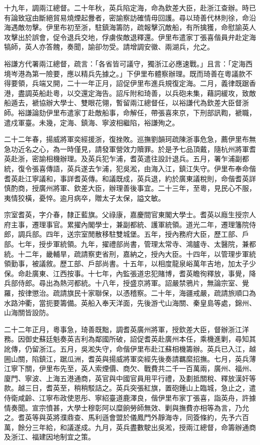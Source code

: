 \begin{pinyinscope}
十九年，調兩江總督。二十年秋，英兵陷定海，命為欽差大臣，赴浙江查辦。時已有論致寇由斷絕貿易燒煙起釁者，密諭察訪確情毋回護。尋以琦善代林則徐，命沿海遇敵勿擊。伊里布初至浙，駐鎮海籌防，疏報擊沉敵船，有所擒獲，命慰諭英人攻擊出於誤會，促令退兵交地，俘虜俟敵退釋還。伊里布遣家丁張喜偕員弁赴定海犒師，英人亦答餽，奏聞，諭卻勿受。請增調安徽、兩湖兵，允之。

裕謙方代署兩江總督，疏言：「各省皆可議守，獨浙江必應速戰。」且言：「定海西境岑港為第一險要，應以精兵先據之。」下伊里布體察辦理。既而琦善在粵議款不得要領，兵端又開，二十一年正月，詔促伊里布進兵規復定海。二月，義律既踞香港，盡調英船赴粵，以交還定海告。詔斥附和琦善，以兵砲未集，藉詞緩攻，致敵船遁去，褫協辦大學士、雙眼花翎，暫留兩江總督任，以裕謙代為欽差大臣督浙師。裕謙論劾伊里布遣家丁赴敵船事，命解任，帶張喜來京，下刑部訊鞫，褫職，遣戍軍臺。未幾，定海、鎮海、寧波相繼陷，裕謙殉之。

二十二年春，揚威將軍奕經援浙，復挫敗。巡撫劉韻珂疏陳浙事危急，薦伊里布無急功近名之心，為一時僅見，請發軍營效力贖罪。於是予七品頂戴，隨杭州將軍耆英赴浙，密諭相機辦理。及英兵犯乍浦，耆英遣往設計退兵。五月，署乍浦副都統，復令張喜傳語，英兵遂去乍浦，犯吳淞，由海入江，鎮江失守。伊里布奉命偕耆英赴江寧議和，事詳耆英傳。和議既成，英兵退，約於廣東議稅則，命偕耆英詳慎酌商，授廣州將軍、欽差大臣，辦理善後事宜。二十三年，至粵，見民心不服，夷情狡橫，憂悴。逾月病卒，贈太子太保，謚文敏。

宗室耆英，字介春，隸正藍旗。父祿康，嘉慶間官東閣大學士。耆英以廕生授宗人府主事，遷理事官。累擢內閣學士，兼副都統、護軍統領。道光二年，遷理籓院侍郎，調兵部。四年，送宗室閒散移駐雙城堡。五年，授內務府大臣，歷工部、戶部。七年，授步軍統領。九年，擢禮部尚書，管理太常寺、鴻臚寺、太醫院，兼都統。十二年，畿輔旱，疏請察吏省刑，嘉納之，授內大臣。十四年，以管理步軍統領勤事，被議敘。歷工部、戶部尚書。十五年，以相度龍泉峪萬年吉地，加太子少保。命赴廣東、江西按事。十七年，內監張道忠犯賭博，耆英瞻徇釋放，事覺，降兵部侍郎。尋出為熱河都統。十八年，授盛京將軍。詔嚴禁鴉片，無論宗室、覺羅，按律懲治。疏請旗民十家聯保，以憑稽察。二十年，海疆戒嚴，疏請旅順口為水路沖衢，當扼要籌備。英船入奉天洋面，先後游弋山海關、秦皇島等處，錦州、山海關皆設防。

二十二年正月，粵事急，琦善既黜，調耆英廣州將軍，授欽差大臣，督辦浙江洋務。因御史蘇廷魁奏英吉利為鄰國所破，詔促耆英赴廣州本任，乘機進剿，尋知其訛傳，仍留浙江。五月，吳淞失守，命偕伊里布赴江蘇相機籌辦。英兵已入江，越圌山關，陷鎮江，踞瓜洲，耆英與揚威將軍奕經先後奏請羈縻招撫。七月，英兵薄江寧下關，伊里布先至，英人索煙價、商欠、戰費共二千一百萬兩，廣州、福州、廈門、寧波、上海五港通商，英官與中國官員用平行禮，及劃抵關稅、釋放漢奸等款。越三日，耆英至，稍稍駁詰之。英兵突張紅旗，置砲鍾山上臨城，急止之，遣侍衛咸齡、江寧布政使恩彤、寧紹臺道鹿澤良，偕伊里布家丁張喜，詣英舟，許據情奏聞。宣宗憤甚，大學士穆彰阿以糜餉勞師無效、剿與撫費亦相等為言，乃允之。耆英等與英將濮鼎查、馬利遜會盟於儀鳳門外靜海寺，同簽條約，先予六百萬，餘分三年給，和議遂成。九月，英兵盡數駛出吳淞，授兩江總督，命籌辦通商及浙江、福建因地制宜之策。


\end{pinyinscope}
